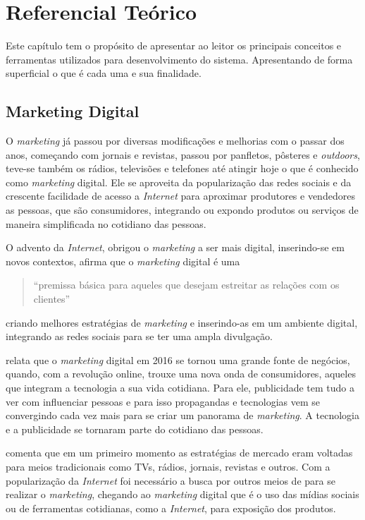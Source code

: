 \chapter[Referencial Teórico]{Referencial Teórico}
\label{cap:referencial}
Este capítulo tem o propósito de apresentar ao leitor os principais conceitos e ferramentas utilizados para desenvolvimento do sistema. Apresentando de forma superficial o que é cada uma e sua finalidade. 

\section{Marketing Digital}
O \textit{marketing} já passou por diversas modificações e melhorias com o passar dos anos, começando com jornais e revistas, passou por panfletos, pôsteres e \textit{outdoors}, teve-se também os rádios, televisões e telefones até atingir hoje o que é conhecido como \textit{marketing} digital. Ele se aproveita da popularização das redes sociais e da crescente facilidade de acesso a \textit{Internet} para aproximar produtores e vendedores as pessoas, que são consumidores, integrando ou expondo produtos ou serviços de maneira simplificada no cotidiano das pessoas.

O advento da \textit{Internet}, obrigou o \textit{marketing} a ser mais digital, inserindo-se em novos contextos, \citet{canto2017} afirma que o \textit{marketing} digital é uma \begin{quote} ``premissa básica para aqueles que desejam estreitar as relações com os clientes''\end{quote} criando melhores estratégias de \textit{marketing} e inserindo-as em um ambiente digital, integrando as redes sociais para se ter uma ampla divulgação.

\citet[p.2]{ryan2016} relata que o \textit{marketing} digital em 2016 se tornou uma grande fonte de negócios, quando, com a revolução online, trouxe uma nova onda de consumidores, aqueles que integram a tecnologia a sua vida cotidiana. Para ele, publicidade tem tudo a ver com influenciar pessoas e para isso propagandas e tecnologias vem se convergindo cada vez mais para se criar um panorama de \textit{marketing}. A tecnologia e a publicidade se tornaram parte do cotidiano das pessoas.

\citet{santos2014} comenta que em um primeiro momento as estratégias de mercado eram voltadas para meios tradicionais como TVs, rádios, jornais, revistas e outros. Com a popularização da \textit{Internet} foi necessário a busca por outros meios de para se realizar
o \textit{marketing}, chegando ao \textit{marketing} digital que é o uso das mídias sociais ou de ferramentas cotidianas, como a \textit{Internet}, para exposição dos produtos.

